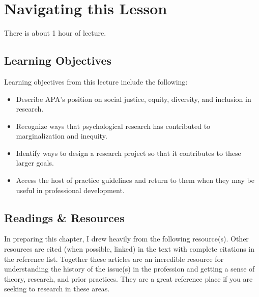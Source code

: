 \documentclass[
  english,
]{book}
\providecommand{\tightlist}{%
  \setlength{\itemsep}{0pt}\setlength{\parskip}{0pt}}
\begin{document}
\hypertarget{navigating-this-lesson-6}{%
\section{Navigating this Lesson}\label{navigating-this-lesson-6}}

There is about 1 hour of lecture.

\hypertarget{learning-objectives-6}{%
\subsection{Learning Objectives}\label{learning-objectives-6}}

Learning objectives from this lecture include the following:

\begin{itemize}
\tightlist
\item
  Describe APA's position on social justice, equity, diversity, and inclusion in research.
\item
  Recognize ways that psychological research has contributed to marginalization and inequity.
\item
  Identify ways to design a research project so that it contributes to these larger goals.
\item
  Access the host of practice guidelines and return to them when they may be useful in professional development.
\end{itemize}

\hypertarget{readings-resources-6}{%
\subsection{Readings \& Resources}\label{readings-resources-6}}

In preparing this chapter, I drew heavily from the following resource(s). Other resources are cited (when possible, linked) in the text with complete citations in the reference list. Together these articles are an incredible resource for understanding the history of the issue(s) in the profession and getting a sense of theory, research, and prior practices. They are a great reference place if you are seeking to research in these areas.
\end{document}

